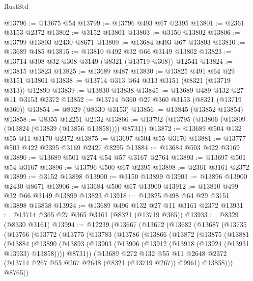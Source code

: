 \begin{lexlean}{RustStd}
\begin{coremodule}
@13796 := @13675 @54
@13799 := @13796 @493 @67 @2395
@13801 := @2361 @3153 @2372
@13802 := @3152 @13801
@13803 := @3150 @13802
@13806 := @13799 @13803 @2430 @8671
@13809 := @13684 @493 @67 @13803
@13810 := @13689 @485
@13815 := @13810 @492 @32 @66 @3149 @13802
@13823 := @13714 @308 @32 @308 @3149 (@8321 (@13719 @308)) @12541
@13824 := @13815 @13823
@13825 := @13689 @487
@13830 := @13825 @491 @64 @29 @3151 @13801
@13838 := @13714 @313 @64 @313 @3151 (@8321 (@13719 @313)) @12890
@13839 := @13830 @13838
@13845 := @13689 @489 @132 @27 @11 @3153 @2372
@13852 := @13714 @360 @27 @360 @3153 (@8321 (@13719 @360))
@13854 := @8329 (@8330 @3153)
@13856 := @13845 (@13852 @13854)
@13858 := @8355 @12251 @2132
@13866 := @13792 (@13795 (@13806 (@13809 (@13824 (@13839 (@13856 @13858)))) @8731))
@13872 := @13689 @504 @132 @55 @11 @3170 @2372
@13875 := @13697 @504 @55 @3170
@13881 := @13777 @503 @422 @2395 @3169 @2427 @8295
@13884 := @13684 @503 @422 @3169
@13890 := @13689 @501 @274 @54 @57 @3167 @2764
@13893 := @13697 @501 @54 @3167
@13896 := @13796 @500 @67 @2395
@13898 := @2361 @3161 @2372
@13899 := @3152 @13898
@13900 := @3150 @13899
@13903 := @13896 @13900 @2430 @8671
@13906 := @13684 @500 @67 @13900
@13912 := @13810 @499 @32 @66 @3149 @13899 @13823
@13918 := @13825 @498 @64 @29 @3151 @13898 @13838
@13924 := @13689 @496 @132 @27 @11 @3161 @2372
@13931 := @13714 @365 @27 @365 @3161 (@8321 (@13719 @365))
@13933 := @8329 (@8330 @3161)
@13994 := @12239
    (@13667
      (@13672
        (@13682
          (@13687
            (@13735
              (@13766
                (@13772
                  (@13775
                    (@13783
                      (@13786
                        (@13866
                          (@13872
                            (@13875
                              (@13881
                                (@13884
                                  (@13890
                                    (@13893
                                      (@13903
                                        (@13906 (@13912 (@13918 (@13924 (@13931 @13933) @13858))))
                                        @8731))
                                    (@13689
                                      @272
                                      @132
                                      @55
                                      @11
                                      @2648
                                      @2372
                                      (@13714 @267 @55 @267 @2648 (@8321 (@13719 @267)) @9961)
                                      @13858)))
                                @8765))

\end{coremodule}
\end{lexlean}
